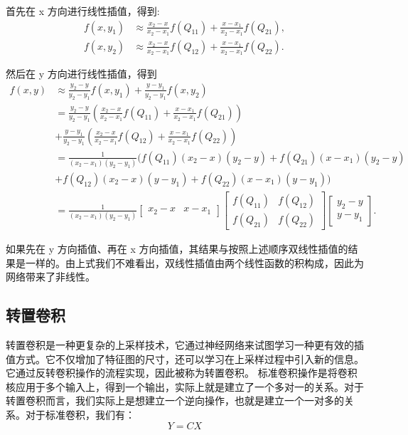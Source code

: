 首先在 x 方向进行线性插值，得到:
\begin{align}
f(x, y_1) &\approx \frac{x_2-x}{x_2-x_1} f(Q_{11}) + \frac{x-x_1}{x_2-x_1} f(Q_{21}), \\
f(x, y_2) &\approx \frac{x_2-x}{x_2-x_1} f(Q_{12}) + \frac{x-x_1}{x_2-x_1} f(Q_{22}).
\end{align}

然后在 y 方向进行线性插值，得到 
\begin{equation}
  \begin{aligned}
    f(x,y) &\approx \frac{y_2-y}{y_2-y_1} f(x, y_1) + \frac{y-y_1}{y_2-y_1} f(x, y_2) \\
&= \frac{y_2-y}{y_2-y_1} \left ( \frac{x_2-x}{x_2-x_1} f(Q_{11}) + \frac{x-x_1}{x_2-x_1} f(Q_{21}) \right ) \\
&+ \frac{y-y_1}{y_2-y_1} \left ( \frac{x_2-x}{x_2-x_1} f(Q_{12}) + \frac{x-x_1}{x_2-x_1} f(Q_{22}) \right ) \\
&= \frac{1}{(x_2-x_1)(y_2-y_1)} \big( f(Q_{11})(x_2-x)(y_2-y)+ f(Q_{21})(x-x_1)(y_2-y)\\
&+  f(Q_{12})(x_2-x)(y-y_1) + f(Q_{22})(x-x_1)(y-y_1) \big)\\
&=\frac{1}{(x_2-x_1)(y_2-y_1)}  \begin{bmatrix} x_2-x & x-x_1 \end{bmatrix} \begin{bmatrix} f(Q_{11}) & f(Q_{12}) \\ f(Q_{21})& f(Q_{22}) \end{bmatrix} \begin{bmatrix}
y_2-y \\ y-y_1 \end{bmatrix}.
  \end{aligned}
\end{equation}

如果先在 y 方向插值、再在 x 方向插值，其结果与按照上述顺序双线性插值的结果是一样的。由上式我们不难看出，双线性插值由两个线性函数的积构成，因此为网络带来了非线性。

\subsection{转置卷积}

转置卷积\cite{2018guideconvolutionarithmeticdeeplearning}是一种更复杂的上采样技术，它通过神经网络来试图学习一种更有效的插值方式。它不仅增加了特征图的尺寸，还可以学习在上采样过程中引入新的信息。它通过反转卷积操作的流程实现，因此被称为转置卷积。
标准卷积操作是将卷积核应用于多个输入上，得到一个输出，实际上就是建立了一个多对一的关系。对于转置卷积而言，我们实际上是想建立一个逆向操作，也就是建立一个一对多的关系。对于标准卷积，我们有：
\begin{equation}
𝑌=𝐶𝑋
\end{equation}

